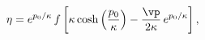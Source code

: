 \begin{equation}\label{23}
 \eta = e^{p_0/\kappa} \, f\left[\kappa\cosh\left(\frac{p_0}\kappa\right) - \frac{\vp}{2\kappa}\, e^{p_0/\kappa}\right],
\end{equation}

